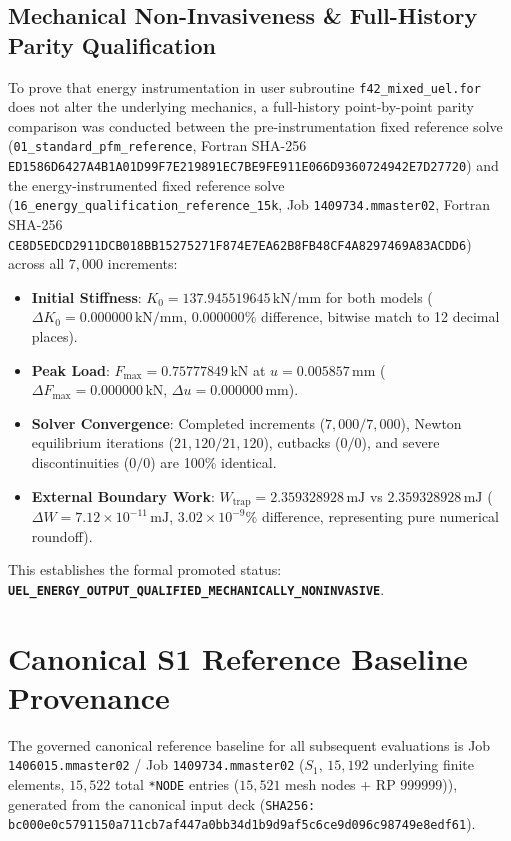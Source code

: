 \subsection{Mechanical Non-Invasiveness \& Full-History Parity Qualification}
\label{sec:mechanical_parity_qualification}

To prove that energy instrumentation in user subroutine \nolinkurl{f42_mixed_uel.for} does not alter the underlying mechanics, a full-history point-by-point parity comparison was conducted between the pre-instrumentation fixed reference solve (\nolinkurl{01_standard_pfm_reference}, Fortran SHA-256 \nolinkurl{ED1586D6427A4B1A01D99F7E219891EC7BE9FE911E066D9360724942E7D27720}) and the energy-instrumented fixed reference solve (\nolinkurl{16_energy_qualification_reference_15k}, Job \texttt{1409734.mmaster02}, Fortran SHA-256 \nolinkurl{CE8D5EDCD2911DCB018BB15275271F874E7EA62B8FB48CF4A8297469A83ACDD6}) across all $7{,}000$ increments:
\begin{itemize}
    \item \textbf{Initial Stiffness}: $K_0 = 137.945519645\,\text{kN/mm}$ for both models ($\Delta K_0 = 0.000000\,\text{kN/mm}$, $0.000000\%$ difference, bitwise match to 12 decimal places).
    \item \textbf{Peak Load}: $F_{\max} = 0.75777849\,\text{kN}$ at $u = 0.005857\,\text{mm}$ ($\Delta F_{\max} = 0.000000\,\text{kN}$, $\Delta u = 0.000000\,\text{mm}$).
    \item \textbf{Solver Convergence}: Completed increments ($7{,}000/7{,}000$), Newton equilibrium iterations ($21{,}120/21{,}120$), cutbacks ($0/0$), and severe discontinuities ($0/0$) are 100\% identical.
    \item \textbf{External Boundary Work}: $W_{\mathrm{trap}} = 2.359328928\,\text{mJ}$ vs $2.359328928\,\text{mJ}$ ($\Delta W = 7.12\times 10^{-11}\,\text{mJ}$, $3.02\times 10^{-9}\%$ difference, representing pure numerical roundoff).
\end{itemize}
This establishes the formal promoted status: \textbf{\texttt{UEL\_ENERGY\_OUTPUT\_QUALIFIED\_MECHANICALLY\_NONINVASIVE}}.

\section{Canonical S1 Reference Baseline Provenance}
\label{sec:fixed_mesh_reference_anchor}

The governed canonical reference baseline for all subsequent evaluations is Job \texttt{1406015.mmaster02} / Job \texttt{1409734.mmaster02} ($S_1$, $15{,}192$ underlying finite elements, $15{,}522$ total \texttt{*NODE} entries ($15{,}521$ mesh nodes + RP 999999)), generated from the canonical input deck (\nolinkurl{SHA256: bc000e0c5791150a711cb7af447a0bb34d1b9d9af5c6ce9d096c98749e8edf61}).

